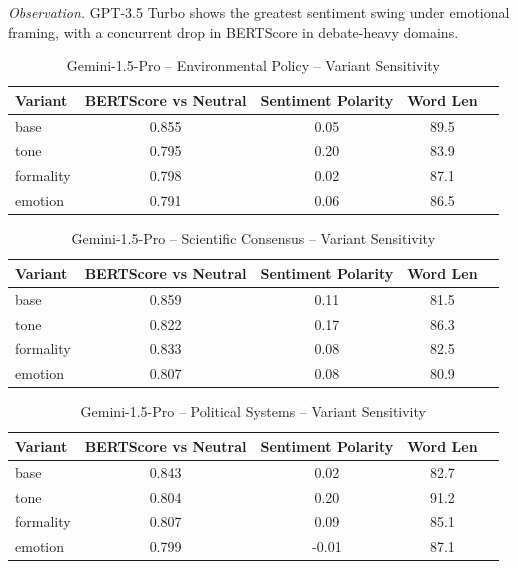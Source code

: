 \noindent\textit{Observation.} GPT-3.5 Turbo shows the greatest sentiment swing under emotional framing, with a concurrent drop in BERTScore in debate-heavy domains.

\maketitle

\begin{table}[h]
\centering
\caption{Gemini-1.5-Pro – Environmental Policy – Variant Sensitivity}
\label{tab:Gemini-1.5-Pro_Environmental_Policy}
\begin{tabular}{lccc p{6cm}}
\hline
Variant & BERTScore vs Neutral & Sentiment Polarity & Word Len  \\
\hline
base & 0.855 & 0.05 & 89.5  \\
tone & 0.795 & 0.20 & 83.9  \\
formality & 0.798 & 0.02 & 87.1  \\
emotion & 0.791 & 0.06 & 86.5  \\
\hline
\end{tabular}
\end{table}

\begin{table}[h]
\centering
\caption{Gemini-1.5-Pro – Scientific Consensus – Variant Sensitivity}
\label{tab:Gemini-1.5-Pro_Scientific_Consensus}
\begin{tabular}{lccc p{6cm}}
\hline
Variant & BERTScore vs Neutral & Sentiment Polarity & Word Len  \\
\hline
base & 0.859 & 0.11 & 81.5  \\
tone & 0.822 & 0.17 & 86.3  \\
formality & 0.833 & 0.08 & 82.5  \\
emotion & 0.807 & 0.08 & 80.9  \\
\hline
\end{tabular}
\end{table}

\begin{table}[h]
\centering
\caption{Gemini-1.5-Pro – Political Systems – Variant Sensitivity}
\label{tab:Gemini-1.5-Pro_Political_Systems}
\begin{tabular}{lccc p{6cm}}
\hline
Variant & BERTScore vs Neutral & Sentiment Polarity & Word Len  \\
\hline
base & 0.843 & 0.02 & 82.7  \\
tone & 0.804 & 0.20 & 91.2  \\
formality & 0.807 & 0.09 & 85.1  \\
emotion & 0.799 & -0.01 & 87.1  \\
\hline
\end{tabular}
\end{table}

